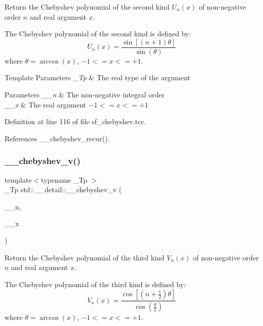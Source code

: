 Return the Chebyshev polynomial of the second kind $ U_n(x) $ of non-\/negative order $ n $ and real argument $ x $.

The Chebyshev polynomial of the second kind is defined by\+: \[ U_n(x) = \frac{\sin \left[(n+1)\theta \right]}{\sin(\theta)} \] where $ \theta = \arccos(x) $, $ -1 <= x <= +1 $.


\begin{DoxyTemplParams}{Template Parameters}
{\em \+\_\+\+Tp} & The real type of the argument \\
\hline
\end{DoxyTemplParams}

\begin{DoxyParams}{Parameters}
{\em \+\_\+\+\_\+n} & The non-\/negative integral order \\
\hline
{\em \+\_\+\+\_\+x} & The real argument $ -1 <= x <= +1 $ \\
\hline
\end{DoxyParams}


Definition at line 116 of file sf\+\_\+chebyshev.\+tcc.



References \+\_\+\+\_\+chebyshev\+\_\+recur().

\mbox{\label{namespacestd_1_1____detail_a684b312a311bbe2065a2633220f4507d}} 
\subsubsection{\texorpdfstring{\+\_\+\+\_\+chebyshev\+\_\+v()}{\_\_chebyshev\_v()}}
{\footnotesize\ttfamily template$<$typename \+\_\+\+Tp $>$ \\
\+\_\+\+Tp std\+::\+\_\+\+\_\+detail\+::\+\_\+\+\_\+chebyshev\+\_\+v (\begin{DoxyParamCaption}\item[{unsigned int}]{\+\_\+\+\_\+n,  }\item[{\+\_\+\+Tp}]{\+\_\+\+\_\+x }\end{DoxyParamCaption})}

Return the Chebyshev polynomial of the third kind $ V_n(x) $ of non-\/negative order $ n $ and real argument $ x $.

The Chebyshev polynomial of the third kind is defined by\+: \[ V_n(x) = \frac{\cos \left[ \left(n+\frac{1}{2}\right)\theta \right]} {\cos \left(\frac{\theta}{2}\right)} \] where $ \theta = \arccos(x) $, $ -1 <= x <= +1 $.


